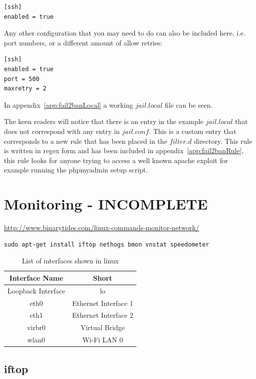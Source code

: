 \begin{verbatim}
[ssh]
enabled = true
\end{verbatim}

Any other configuration that you may need to do can also be included here, i.e. port numbers, or a different amount of allow retries:

\begin{verbatim}
[ssh]
enabled = true
port = 500
maxretry = 2
\end{verbatim}

In appendix~\ref{app:fail2banLocal} a working $jail.local$ file can be seen.

The keen readers will notice that there is an entry in the example $jail.local$ that does not correspond with any entry in $jail.conf$.  This is a custom entry that corresponds to a new rule that has been placed in the $filter.d$ directory.  This rule is written in regex form and has been included in appendix~\ref{app:fail2banRule}, this rule looks for anyone trying to access a well known apache exploit for example running the phpmyadmin setup script.


\section{Monitoring - INCOMPLETE}
\label{sec:monitoring}

\url{http://www.binarytides.com/linux-commands-monitor-network/}

\begin{lstlisting}
sudo apt-get install iftop nethogs bmon vnstat speedometer
\end{lstlisting}

\begin{table}[!th]
\centering
\begin{tabular}{cc}
\hline
Interface Name & Short\\
\hline
Loopback Interface & lo\\
eth0 & Ethernet Interface 1\\
eth1 & Ethernet Interface 2\\
virbr0 & Virtual Bridge\\
wlan0 & Wi-Fi LAN 0\\
\hline
\end{tabular}
\caption{List of interfaces shown in linux}
\label{tab:interface}
\end{table}

\subsection{iftop}

